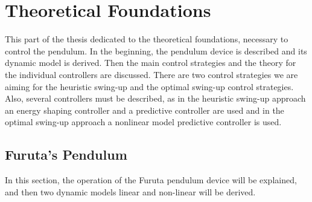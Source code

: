 \chapter{Theoretical Foundations}
This part of the thesis dedicated to the theoretical foundations, necessary to control the pendulum. In the beginning, the pendulum device is described and its dynamic model is derived. Then the main control strategies and the theory for the individual controllers are discussed. There are two control strategies we are aiming for the heuristic swing-up and the optimal swing-up control strategies. Also, several controllers must be described, as in the heuristic swing-up approach an energy shaping controller and a predictive controller are used and in the optimal swing-up approach a nonlinear model predictive controller is used.
\section{Furuta's Pendulum}\label{furuta_Theory}
In this section, the operation of the Furuta pendulum device will be explained, and then two dynamic models linear and non-linear will be derived.

